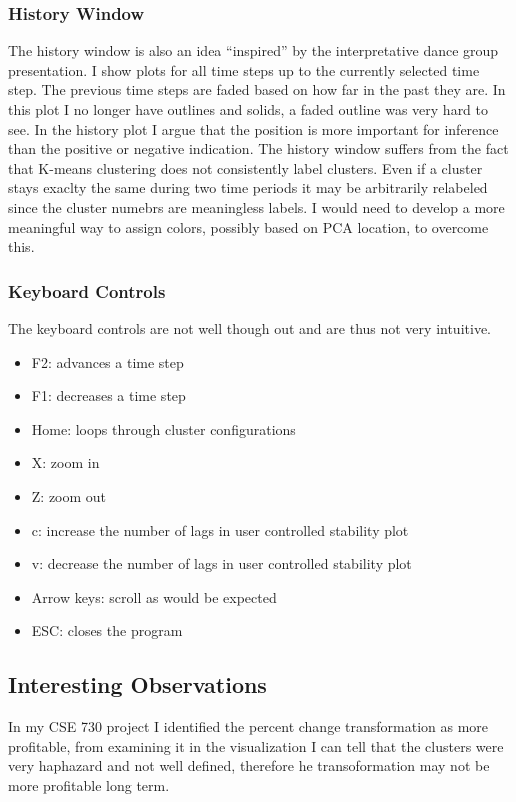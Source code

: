 \documentclass{article}
\begin{document}
\begin{multicols}{2}
\subsubsection{History Window}
The history window is also an idea ``inspired'' by the interpretative dance group presentation.  I show plots for all time steps up to the currently selected time step.  The previous time steps are faded based on how far in the past they are.  In this plot I no longer have outlines and solids, a faded outline was very hard to see.  In the history plot I argue that the position is more important for inference than the positive or negative indication.  The history window suffers from the fact that K-means clustering does not consistently label clusters.  Even if a cluster stays exaclty the same during two time periods it may be arbitrarily relabeled since the cluster numebrs are meaningless labels.  I would need to develop a more meaningful way to assign colors, possibly based on PCA location, to overcome this.

\subsubsection{Keyboard Controls}
The keyboard controls are not well though out and are thus not very intuitive.

\begin{itemize}
	\item F2: advances a time step
	\item F1: decreases a time step
	\item Home: loops through cluster configurations
	\item X: zoom in
	\item Z: zoom out
	\item c: increase the number of lags in user controlled stability plot
	\item v: decrease the number of lags in user controlled stability plot
	\item Arrow keys: scroll as would be expected
	\item ESC: closes the program
\end{itemize}

\subsection{Interesting Observations}
In my CSE 730 project I identified the percent change transformation as more profitable, from examining it in the visualization I can tell that the clusters were very haphazard and not well defined, therefore he transoformation may not be more profitable long term.




\end{multicols}
\end{document}
